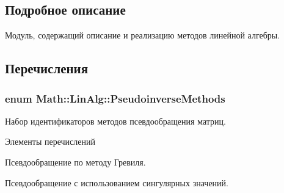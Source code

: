 \subsection{Подробное описание}
Модуль, содержащий описание и реализацию методов линейной алгебры. 

\subsection{Перечисления}
\subsubsection[{\texorpdfstring{Pseudoinverse\+Methods}{PseudoinverseMethods}}]{\setlength{\rightskip}{0pt plus 5cm}enum {\bf Math\+::\+Lin\+Alg\+::\+Pseudoinverse\+Methods}\hspace{0.3cm}{\ttfamily [strong]}}\hypertarget{namespace_math_1_1_lin_alg_a34ee452c5d64eeb10e1bb63cf887af17}{}\label{namespace_math_1_1_lin_alg_a34ee452c5d64eeb10e1bb63cf887af17}


Набор идентификаторов методов псевдообращения матриц. 

\begin{Desc}
\item[Элементы перечислений]\par
\begin{description}
\item[{\em 
G\+R\+E\+V\+I\+L\+LE\hypertarget{namespace_math_1_1_lin_alg_a34ee452c5d64eeb10e1bb63cf887af17a9febc190323c06d33ae8d8716f98bfe9}{}\label{namespace_math_1_1_lin_alg_a34ee452c5d64eeb10e1bb63cf887af17a9febc190323c06d33ae8d8716f98bfe9}
}]Псевдообращение по методу Гревиля. \item[{\em 
S\+VD\hypertarget{namespace_math_1_1_lin_alg_a34ee452c5d64eeb10e1bb63cf887af17a595e2d2f1a68ede96e96f849a85370bc}{}\label{namespace_math_1_1_lin_alg_a34ee452c5d64eeb10e1bb63cf887af17a595e2d2f1a68ede96e96f849a85370bc}
}]Псевдообращение с использованием сингулярных значений. \end{description}
\end{Desc}


